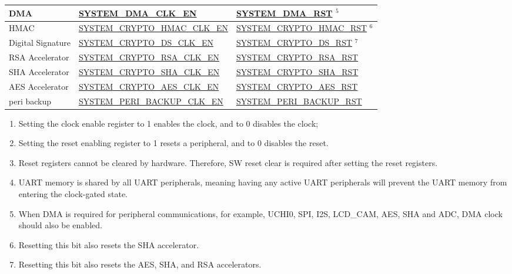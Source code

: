 \documentclass[main\_\_EN.tex]{subfiles}
\begin{document}
\begin{longtable}[c]{ |p{4cm}|p{6cm}|p{6cm}| }
DMA & \hyperref[fielddesc:SYSTEMDMACLKEN]{SYSTEM\_DMA\_CLK\_EN} & \hyperref[fielddesc:SYSTEMDMARST]{SYSTEM\_DMA\_RST} {\hyperref[other:sysreg-reset-notes]{$^5$}}  \\\hline
HMAC & \hyperref[fielddesc:SYSTEMCRYPTOHMACCLKEN]{SYSTEM\_CRYPTO\_HMAC\_CLK\_EN} & \hyperref[fielddesc:SYSTEMCRYPTOHMACRST]{SYSTEM\_CRYPTO\_HMAC\_RST} {\hyperref[other:sysreg-reset-notes]{$^6$}} \\\hline
Digital Signature & \hyperref[fielddesc:SYSTEMCRYPTODSCLKEN]{SYSTEM\_CRYPTO\_DS\_CLK\_EN} & \hyperref[fielddesc:SYSTEMCRYPTODSRST]{SYSTEM\_CRYPTO\_DS\_RST} {\hyperref[other:sysreg-reset-notes]{$^7$}} \\\hline
RSA Accelerator & \hyperref[fielddesc:SYSTEMCRYPTORSACLKEN]{SYSTEM\_CRYPTO\_RSA\_CLK\_EN} & \hyperref[fielddesc:SYSTEMCRYPTORSARST]{SYSTEM\_CRYPTO\_RSA\_RST} \\\hline
SHA Accelerator & \hyperref[fielddesc:SYSTEMCRYPTOSHACLKEN]{SYSTEM\_CRYPTO\_SHA\_CLK\_EN} & \hyperref[fielddesc:SYSTEMCRYPTOSHARST]{SYSTEM\_CRYPTO\_SHA\_RST} \\\hline
AES Accelerator & \hyperref[fielddesc:SYSTEMCRYPTOAESCLKEN]{SYSTEM\_CRYPTO\_AES\_CLK\_EN} & \hyperref[fielddesc:SYSTEMCRYPTOAESRST]{SYSTEM\_CRYPTO\_AES\_RST} \\\hline
peri backup & \hyperref[fielddesc:SYSTEMPERIBACKUPCLKEN]{SYSTEM\_PERI\_BACKUP\_CLK\_EN} & \hyperref[fielddesc:SYSTEMPERIBACKUPRST]{SYSTEM\_PERI\_BACKUP\_RST} \\\hline
\end{longtable}
\begin{tiplisting}
\vspace{-3em}\label{other:sysreg-reset-notes}
\begin{enumerate}
    \item Setting the clock enable register to 1 enables the clock, and to 0 disables the clock;
    \item Setting the reset enabling register to 1 resets a peripheral, and to 0 disables the reset.
    \item Reset registers cannot be cleared by hardware. Therefore, SW reset clear is required after setting the reset registers.
    \item UART memory is shared by all UART peripherals, meaning having any active UART peripherals will prevent the UART memory from entering the clock-gated state.
    \item When DMA is required for peripheral communications, for example, UCHI0, SPI, I2S, LCD\_CAM, AES, SHA and ADC, DMA clock should also be enabled.
    \item Resetting this bit also resets the SHA accelerator.
    \item Resetting this bit also resets the AES, SHA, and RSA accelerators.
\end{enumerate}
\end{tiplisting}
\end{document}
